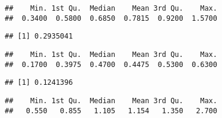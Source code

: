 \documentclass[
]{article}
\newenvironment{Shaded}{\begin{snugshade}}{\end{snugshade}}
\newcommand{\DataTypeTok}[1]{\textcolor[rgb]{0.13,0.29,0.53}{#1}}
\newcommand{\KeywordTok}[1]{\textcolor[rgb]{0.13,0.29,0.53}{\textbf{#1}}}
\newcommand{\NormalTok}[1]{#1}
\newcommand{\OperatorTok}[1]{\textcolor[rgb]{0.81,0.36,0.00}{\textbf{#1}}}
\newcommand{\StringTok}[1]{\textcolor[rgb]{0.31,0.60,0.02}{#1}}
\begin{document}
\begin{verbatim}
##    Min. 1st Qu.  Median    Mean 3rd Qu.    Max. 
##  0.3400  0.5800  0.6850  0.7815  0.9200  1.5700
\end{verbatim}

\begin{Shaded}
\end{Shaded}

\begin{verbatim}
## [1] 0.2935041
\end{verbatim}

\begin{Shaded}
\end{Shaded}

\begin{verbatim}
##    Min. 1st Qu.  Median    Mean 3rd Qu.    Max. 
##  0.1700  0.3975  0.4700  0.4475  0.5300  0.6300
\end{verbatim}

\begin{Shaded}
\end{Shaded}

\begin{verbatim}
## [1] 0.1241396
\end{verbatim}

\begin{Shaded}
\end{Shaded}

\begin{verbatim}
##    Min. 1st Qu.  Median    Mean 3rd Qu.    Max. 
##   0.550   0.855   1.105   1.154   1.350   2.700
\end{verbatim}

\begin{Shaded}
\end{Shaded}
\end{document}
